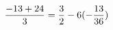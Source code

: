\documentclass[preview]{standalone}
\begin{document}
\begin{align*}
\special{dvisvgm:raw <g id='unique000'>}\frac{-13 + 24}{3} = \frac{3}{2} - 6(- \frac{13}{36})\special{dvisvgm:raw </g>}
\end{align*}
\end{document}
